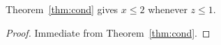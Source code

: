 
\begin{corollary}\label{cor:chain}
Theorem~\ref{thm:cond} gives $x \le 2$ whenever $z \le 1$.
\end{corollary}

\begin{proof}
Immediate from Theorem~\ref{thm:cond}.
\end{proof}

